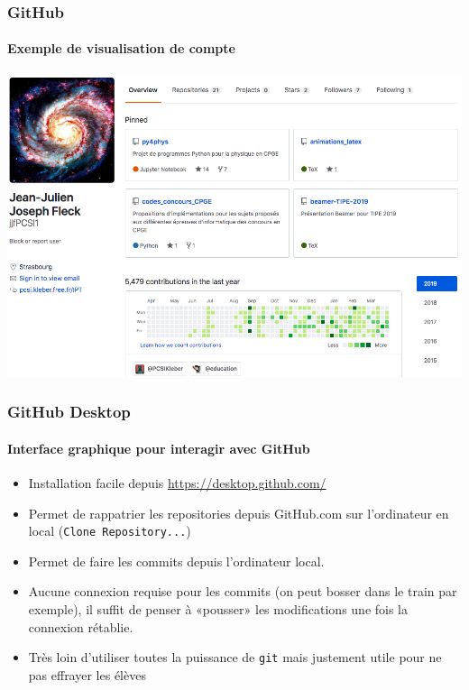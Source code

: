 \begin{frame}
\frametitle{GitHub}
\framesubtitle{Exemple de visualisation de compte}

	\begin{center}
			\includegraphics[width=\linewidth]{figures/github_jjfPCSI1.png}
	\end{center}

\end{frame}

\begin{frame}
	\frametitle{GitHub Desktop}
	\framesubtitle{Interface graphique pour interagir avec GitHub}

	\begin{itemize}[<+->]
		\item Installation facile depuis \url{https://desktop.github.com/}

		\item Permet de rappatrier les repositories depuis GitHub.com sur l'ordinateur en local (\texttt{Clone Repository...})

		\item Permet de faire les commits depuis l'ordinateur local.

		\item Aucune connexion requise pour les commits (on peut bosser dans le train par exemple), il suffit de penser à «pousser» les modifications une fois la connexion rétablie.

		\item Très loin d'utiliser toutes la puissance de \texttt{git} mais justement utile pour ne pas effrayer les élèves

	\end{itemize}

\end{frame}

